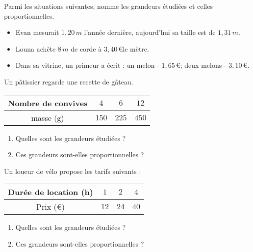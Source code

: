 \begin{pageAD} 


 
Parmi les situations suivantes, nomme les grandeurs étudiées et celles proportionnelles.
\begin{itemize}[leftmargin=*]
 \item Evan mesurait $1,20\,m$ l'année dernière, aujourd'hui sa taille est de $1,31\,m$. 
 \item Louna achète $8\,m$ de corde à $3,40\,$\euro le mètre. 
 \item Dans sa vitrine, un primeur a écrit : un melon - $1,65\,$\euro ; deux melons - $3,10\,$\euro. 
\end{itemize}
 





Un pâtissier regarde une recette de gâteau.
\begin{center}
    \begin{tabular}{|c|c|c|c|}        
    	\hline 
        Nombre de convives & $4$ & $6$ & $12$ \\ 
    	\hline 
         masse (g) & $150$ & $225$ & $450$ \\\hline 
    \end{tabular}
\end{center}

\begin{enumerate}[leftmargin=*]
\item Quelles sont les grandeurs étudiées ? 
\item Ces grandeurs sont-elles proportionnelles ? 
\end{enumerate}
 





Un loueur de vélo propose les tarifs suivants :


\begin{center}
    \begin{tabular}{|c|c|c|c|}\hline 
        Durée de location (h) & $1$ & $2$ & $4$ \\
        \hline Prix (\euro) & $12$ & $24$ & $40$ \\\hline  
    \end{tabular}
\end{center}

\begin{enumerate}[leftmargin=*]
\item Quelles sont les grandeurs étudiées ? 
\item Ces grandeurs sont-elles proportionnelles ? 
\end{enumerate}
 

 

\end{pageAD}  

